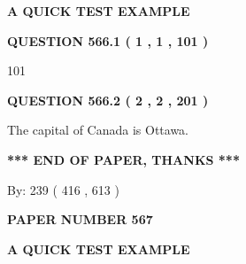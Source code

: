 \documentclass[12pt]{article}
\begin{document}
   
   
   
 \vspace{0.2in}
{\LARGE {\textbf{ A QUICK TEST EXAMPLE}}}
   
   
  
\vspace{0.2in}
  
{\textbf{\Large{QUESTION
566.1 
 ( 1 , 1 , 101 )
}}}
  
  
 
 
\noindent{}

101
 
 
  
\vspace{0.2in}
  
{\textbf{\Large{QUESTION
566.2 
 ( 2 , 2 , 201 )
}}}
  
  
 
 
\noindent{}
 
 
The capital of Canada is Ottawa.
 
 
 
 
   
   
 \vspace{0.2in}
 
   
   
   
   
\vspace{1.0in} 
{\textbf{\large{ *** END OF PAPER, THANKS *** }}} 
   
   
\hspace{1.0in} By: 
 239 ( 416 ,  613 )
   
   
   
   
\newpage 
\setcounter{page}{ 
   567001 } 
   
   
   
   
 {\textbf{ \Large{ PAPER NUMBER  567  }}}
   
   
\vspace{0.2in}
   
   
   
   
   
   
 \vspace{0.2in}
{\LARGE {\textbf{ A QUICK TEST EXAMPLE}}}
   
   
  
\vspace{0.2in}
  
\end{document}
